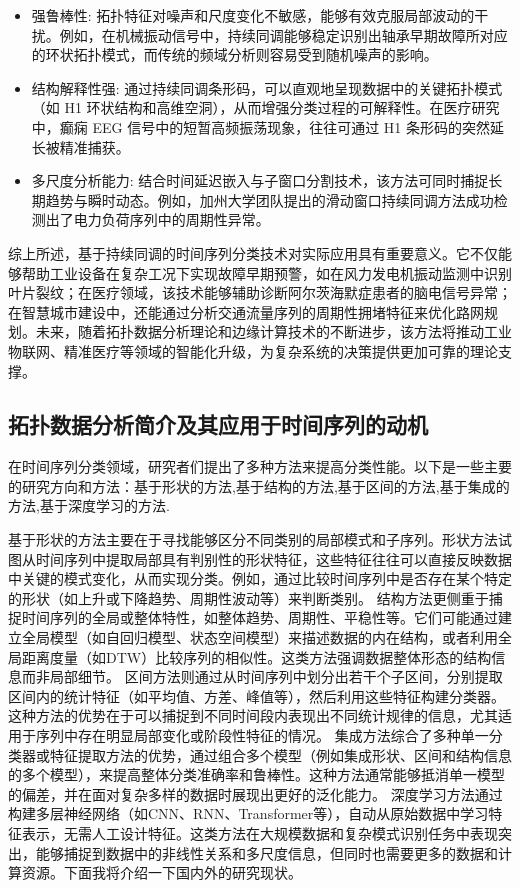 \begin{itemize}
    \item 强鲁棒性: 拓扑特征对噪声和尺度变化不敏感，能够有效克服局部波动的干扰。例如，在机械振动信号中，持续同调能够稳定识别出轴承早期故障所对应的环状拓扑模式，而传统的频域分析则容易受到随机噪声的影响。
    \item 结构解释性强: 通过持续同调条形码，可以直观地呈现数据中的关键拓扑模式（如 H1 环状结构和高维空洞），从而增强分类过程的可解释性。在医疗研究中，癫痫 EEG 信号中的短暂高频振荡现象，往往可通过 H1 条形码的突然延长被精准捕获。
    \item 多尺度分析能力: 结合时间延迟嵌入与子窗口分割技术，该方法可同时捕捉长期趋势与瞬时动态。例如，加州大学团队提出的滑动窗口持续同调方法成功检测出了电力负荷序列中的周期性异常。
\end{itemize}

综上所述，基于持续同调的时间序列分类技术对实际应用具有重要意义。它不仅能够帮助工业设备在复杂工况下实现故障早期预警，如在风力发电机振动监测中识别叶片裂纹；在医疗领域，该技术能够辅助诊断阿尔茨海默症患者的脑电信号异常；在智慧城市建设中，还能通过分析交通流量序列的周期性拥堵特征来优化路网规划。未来，随着拓扑数据分析理论和边缘计算技术的不断进步，该方法将推动工业物联网、精准医疗等领域的智能化升级，为复杂系统的决策提供更加可靠的理论支撑。



\subsection{拓扑数据分析简介及其应用于时间序列的动机}
在时间序列分类领域，研究者们提出了多种方法来提高分类性能。以下是一些主要的研究方向和方法：基于形状的方法,基于结构的方法,基于区间的方法,基于集成的方法,基于深度学习的方法.

基于形状的方法主要在于寻找能够区分不同类别的局部模式和子序列。形状方法试图从时间序列中提取局部具有判别性的形状特征，这些特征往往可以直接反映数据中关键的模式变化，从而实现分类。例如，通过比较时间序列中是否存在某个特定的形状（如上升或下降趋势、周期性波动等）来判断类别。
结构方法更侧重于捕捉时间序列的全局或整体特性，如整体趋势、周期性、平稳性等。它们可能通过建立全局模型（如自回归模型、状态空间模型）来描述数据的内在结构，或者利用全局距离度量（如DTW）比较序列的相似性。这类方法强调数据整体形态的结构信息而非局部细节。
区间方法则通过从时间序列中划分出若干个子区间，分别提取区间内的统计特征（如平均值、方差、峰值等），然后利用这些特征构建分类器。这种方法的优势在于可以捕捉到不同时间段内表现出不同统计规律的信息，尤其适用于序列中存在明显局部变化或阶段性特征的情况。
集成方法综合了多种单一分类器或特征提取方法的优势，通过组合多个模型（例如集成形状、区间和结构信息的多个模型），来提高整体分类准确率和鲁棒性。这种方法通常能够抵消单一模型的偏差，并在面对复杂多样的数据时展现出更好的泛化能力。
深度学习方法通过构建多层神经网络（如CNN、RNN、Transformer等），自动从原始数据中学习特征表示，无需人工设计特征。这类方法在大规模数据和复杂模式识别任务中表现突出，能够捕捉到数据中的非线性关系和多尺度信息，但同时也需要更多的数据和计算资源。下面我将介绍一下国内外的研究现状。

